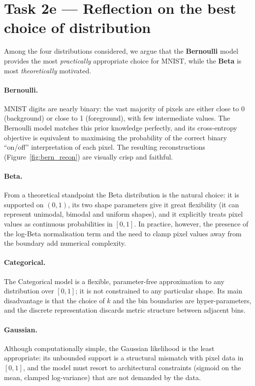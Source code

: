 \documentclass{article}
\begin{document}
\section*{Task 2e --- Reflection on the best choice of distribution}

Among the four distributions considered, we argue that the \textbf{Bernoulli} model
provides the most \emph{practically} appropriate choice for MNIST, while the
\textbf{Beta} is most \emph{theoretically} motivated.

\paragraph{Bernoulli.}
MNIST digits are nearly binary: the vast majority of pixels are either
close to 0 (background) or close to 1 (foreground), with few intermediate values.
The Bernoulli model matches this prior knowledge perfectly, and its cross-entropy
objective is equivalent to maximising the probability of the correct binary
``on/off'' interpretation of each pixel.  The resulting reconstructions
(Figure~\ref{fig:bern_recon}) are visually crisp and faithful.

\paragraph{Beta.}
From a theoretical standpoint the Beta distribution is the natural choice: it
is supported on $(0,1)$, its two shape parameters give it great flexibility
(it can represent unimodal, bimodal and uniform shapes), and it explicitly
treats pixel values as continuous probabilities in $[0,1]$.  In practice,
however, the presence of the log-Beta normalisation term and the need to clamp
pixel values away from the boundary add numerical complexity.

\paragraph{Categorical.}
The Categorical model is a flexible, parameter-free approximation to any
distribution over $[0,1]$; it is not constrained to any particular shape.
Its main disadvantage is that the choice of $k$ and the bin boundaries are
hyper-parameters, and the discrete representation discards metric structure
between adjacent bins.

\paragraph{Gaussian.}
Although computationally simple, the Gaussian likelihood is the least
appropriate: its unbounded support is a structural mismatch with pixel
data in $[0,1]$, and the model must resort to architectural constraints
(sigmoid on the mean, clamped log-variance) that are not demanded by the data.
\end{document}
